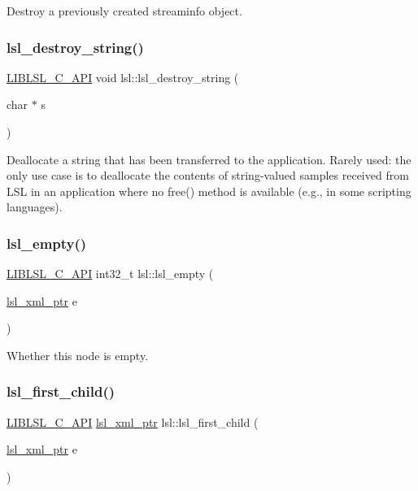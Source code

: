 Destroy a previously created streaminfo object. \mbox{\label{namespacelsl_ac517533eaabb224fd2f893e1f4274d82}} 
\subsubsection{\texorpdfstring{lsl\+\_\+destroy\+\_\+string()}{lsl\_destroy\_string()}}
{\footnotesize\ttfamily \hyperlink{lsl__cpp_8h_aafd0ef1813e8be84a1420c4f1df64615}{L\+I\+B\+L\+S\+L\+\_\+\+C\+\_\+\+A\+PI} void lsl\+::lsl\+\_\+destroy\+\_\+string (\begin{DoxyParamCaption}\item[{char $\ast$}]{s }\end{DoxyParamCaption})}

Deallocate a string that has been transferred to the application. Rarely used\+: the only use case is to deallocate the contents of string-\/valued samples received from L\+SL in an application where no free() method is available (e.\+g., in some scripting languages). \mbox{\label{namespacelsl_aa8e3affdd320f70d77b87262d508ba58}} 
\subsubsection{\texorpdfstring{lsl\+\_\+empty()}{lsl\_empty()}}
{\footnotesize\ttfamily \hyperlink{lsl__cpp_8h_aafd0ef1813e8be84a1420c4f1df64615}{L\+I\+B\+L\+S\+L\+\_\+\+C\+\_\+\+A\+PI} int32\+\_\+t lsl\+::lsl\+\_\+empty (\begin{DoxyParamCaption}\item[{\hyperlink{namespacelsl_a5edc7a49a1a1be1634fe6dce3d59c59b}{lsl\+\_\+xml\+\_\+ptr}}]{e }\end{DoxyParamCaption})}

Whether this node is empty. \mbox{\label{namespacelsl_a00b272ef8da2c1f1a6ea440219728c32}} 
\subsubsection{\texorpdfstring{lsl\+\_\+first\+\_\+child()}{lsl\_first\_child()}}
{\footnotesize\ttfamily \hyperlink{lsl__cpp_8h_aafd0ef1813e8be84a1420c4f1df64615}{L\+I\+B\+L\+S\+L\+\_\+\+C\+\_\+\+A\+PI} \hyperlink{namespacelsl_a5edc7a49a1a1be1634fe6dce3d59c59b}{lsl\+\_\+xml\+\_\+ptr} lsl\+::lsl\+\_\+first\+\_\+child (\begin{DoxyParamCaption}\item[{\hyperlink{namespacelsl_a5edc7a49a1a1be1634fe6dce3d59c59b}{lsl\+\_\+xml\+\_\+ptr}}]{e }\end{DoxyParamCaption})}

